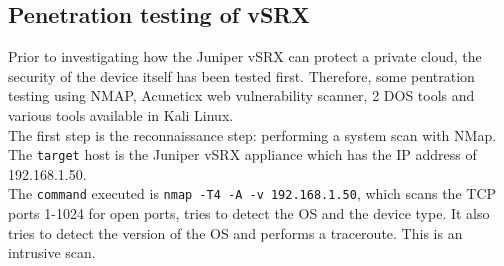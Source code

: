 \documentclass[11pt, a4paper]{article}
\begin{document}
\subsection*{Penetration testing of vSRX}

Prior to investigating how the Juniper vSRX can protect a private cloud, the security of the device itself has been tested first. Therefore, some pentration testing using NMAP, Acuneticx web vulnerability scanner, 2 DOS tools and various tools available in Kali Linux. \\
The first step is the reconnaissance step: performing a system scan with NMap. \\
The \texttt{target} host is the Juniper vSRX appliance which has the IP address of 192.168.1.50. \\
The \texttt{command} executed is \texttt{nmap -T4 -A -v 192.168.1.50}, which scans the TCP ports 1-1024 for open ports, tries to detect the OS and the device type. It also tries to detect the version of the OS and performs a traceroute. This is an intrusive scan. \\
\end{document}
